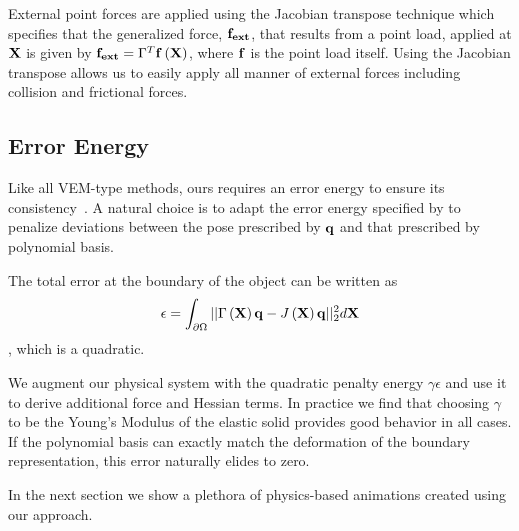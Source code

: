 External point forces are applied using the Jacobian transpose technique which specifies that the generalized force, $\mathbf{f_{ext}}$, 
that results from a point load, applied at $\mathbf{X}$ is given by $\mathbf{f_{ext}}=\Gamma^T\mathbf{f}\left(\mathbf{X}\right)$, where $\mathbf{f}$ is the point load itself.
Using the Jacobian transpose allows us to easily apply all manner of external forces including collision and frictional forces. 

\subsection{Error Energy}
Like all VEM-type methods, ours requires an error energy to ensure its consistency~\cite{10.1142/S021820251440003X}.
A natural choice is to adapt the error energy specified by \citet{10.1145/1073204.1073216} to penalize deviations between the pose prescribed by  $\mathbf{q}$ and 
that prescribed by polynomial basis. 

The total error at the boundary of the object can be written as
\begin{equation}
\epsilon = \int_{\partial\Omega}||\Gamma\left(\mathbf{X}\right)\mathbf{q} - J\left(\mathbf{X}\right)\mathbf{q}||_2^2 d\mathbf{X} \\
\end{equation}, which is a quadratic.

We augment our physical system with the  quadratic penalty energy $\gamma\epsilon$ and use it to derive additional force and Hessian terms.
In practice we find that choosing $\gamma $ to be the Young's Modulus of the elastic solid provides good behavior in all cases.
If the polynomial basis can exactly match the deformation of the boundary representation, this error naturally elides to zero.

In the next section we show a plethora of physics-based animations created using our approach.

